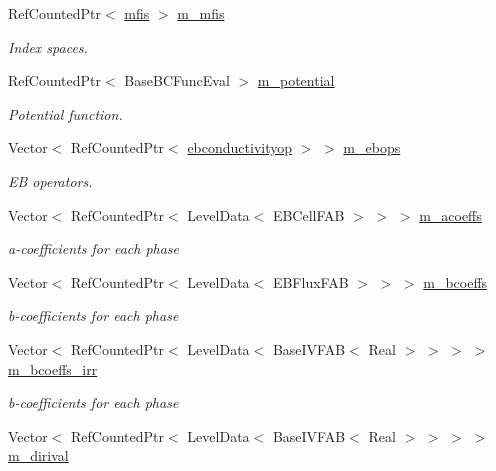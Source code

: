 \begin{DoxyCompactItemize}
\item 
Ref\+Counted\+Ptr$<$ \hyperlink{classmfis}{mfis} $>$ \hyperlink{classmfconductivityop_a1d11d83bdf0df1dbc3d55e2d2ffe9603}{m\+\_\+mfis}
\begin{DoxyCompactList}\small\item\em Index spaces. \end{DoxyCompactList}\item 
Ref\+Counted\+Ptr$<$ Base\+B\+C\+Func\+Eval $>$ \hyperlink{classmfconductivityop_ad62deabff54ede30a117bfec47097095}{m\+\_\+potential}
\begin{DoxyCompactList}\small\item\em Potential function. \end{DoxyCompactList}\item 
Vector$<$ Ref\+Counted\+Ptr$<$ \hyperlink{classebconductivityop}{ebconductivityop} $>$ $>$ \hyperlink{classmfconductivityop_af2c3b82031773d622031e032c961f554}{m\+\_\+ebops}
\begin{DoxyCompactList}\small\item\em EB operators. \end{DoxyCompactList}\item 
Vector$<$ Ref\+Counted\+Ptr$<$ Level\+Data$<$ E\+B\+Cell\+F\+AB $>$ $>$ $>$ \hyperlink{classmfconductivityop_ad5fc4a59bfbb98a0065ef917875e4ef6}{m\+\_\+acoeffs}
\begin{DoxyCompactList}\small\item\em a-\/coefficients for each phase \end{DoxyCompactList}\item 
Vector$<$ Ref\+Counted\+Ptr$<$ Level\+Data$<$ E\+B\+Flux\+F\+AB $>$ $>$ $>$ \hyperlink{classmfconductivityop_a44282d41bc1f23912addf5b8d4dbe1ff}{m\+\_\+bcoeffs}
\begin{DoxyCompactList}\small\item\em b-\/coefficients for each phase \end{DoxyCompactList}\item 
Vector$<$ Ref\+Counted\+Ptr$<$ Level\+Data$<$ Base\+I\+V\+F\+AB$<$ Real $>$ $>$ $>$ $>$ \hyperlink{classmfconductivityop_a136b2438150c02674ca31583b60345e8}{m\+\_\+bcoeffs\+\_\+irr}
\begin{DoxyCompactList}\small\item\em b-\/coefficients for each phase \end{DoxyCompactList}\item 
Vector$<$ Ref\+Counted\+Ptr$<$ Level\+Data$<$ Base\+I\+V\+F\+AB$<$ Real $>$ $>$ $>$ $>$ \hyperlink{classmfconductivityop_a1164b11645550612dfcf9ee111177669}{m\+\_\+dirival}

\end{DoxyCompactItemize}
